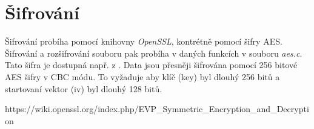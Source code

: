 \documentclass[a4paper, 11pt]{article}
\begin{document}
\section{Šifrování}
Šifrování probíha pomocí knihovny \textit{OpenSSL}, kontrétně pomocí šifry AES. Šifrování a rozšifrování souboru pak probíha v daných funkcích v souboru \textit{aes.c}. Tato šifra je dostupná např. z \cite{aes}. Data jsou přesněji šifrována pomocí 256 bitové AES šifry v CBC módu. To vyžaduje aby klíč (key) byl dlouhý 256 bitů a startovaní vektor (iv) byl dlouhý 128 bitů.

\begin{thebibliography}{2}
https://wiki.openssl.org/index.php/EVP\_Symmetric\_Encryption\_and\_Decryption
\end{thebibliography}
\end{document}
